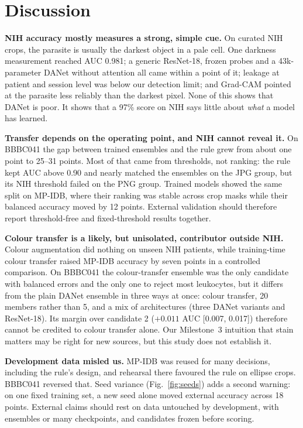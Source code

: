 \documentclass[conference]{IEEEtran}
\begin{document}
\section{Discussion}
\textbf{NIH accuracy mostly measures a strong, simple cue.} On curated NIH crops, the parasite is usually the darkest object in a pale cell. One darkness measurement reached AUC 0.981; a generic ResNet-18, frozen probes and a 43k-parameter DANet without attention all came within a point of it; leakage at patient and session level was below our detection limit; and Grad-CAM pointed at the parasite less reliably than the darkest pixel. None of this shows that DANet is poor. It shows that a 97\% score on NIH says little about \emph{what} a model has learned.

\textbf{Transfer depends on the operating point, and NIH cannot reveal it.} On BBBC041 the gap between trained ensembles and the rule grew from about one point to 25--31 points. Most of that came from thresholds, not ranking: the rule kept AUC above 0.90 and nearly matched the ensembles on the JPG group, but its NIH threshold failed on the PNG group. Trained models showed the same split on MP-IDB, where their ranking was stable across crop masks while their balanced accuracy moved by 12 points. External validation should therefore report threshold-free and fixed-threshold results together.

\textbf{Colour transfer is a likely, but unisolated, contributor outside NIH.} Colour augmentation did nothing on unseen NIH patients, while training-time colour transfer raised MP-IDB accuracy by seven points in a controlled comparison. On BBBC041 the colour-transfer ensemble was the only candidate with balanced errors and the only one to reject most leukocytes, but it differs from the plain DANet ensemble in three ways at once: colour transfer, 20 members rather than 5, and a mix of architectures (three DANet variants and ResNet-18). Its margin over candidate 2 ($+0.011$ AUC [0.007, 0.017]) therefore cannot be credited to colour transfer alone. Our Milestone~3 intuition that stain matters may be right for new sources, but this study does not establish it.

\textbf{Development data misled us.} MP-IDB was reused for many decisions, including the rule's design, and rehearsal there favoured the rule on ellipse crops. BBBC041 reversed that. Seed variance (Fig.~\ref{fig:seeds}) adds a second warning: on one fixed training set, a new seed alone moved external accuracy across 18 points. External claims should rest on data untouched by development, with ensembles or many checkpoints, and candidates frozen before scoring.
\end{document}
